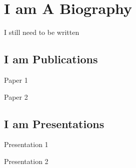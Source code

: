 \chapter{I am A Biography}

I still need to be written
\begin{singlespace}

\section*{I am Publications}

\begin{description}

\item Paper 1

\item Paper 2
\end{description}

\section*{I am Presentations}

\begin{description}

\item Presentation 1

\item Presentation 2

\end{description}

\end{singlespace}
